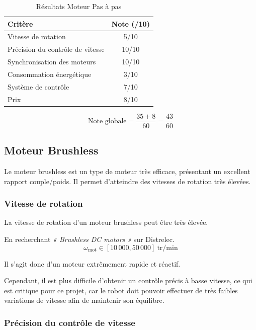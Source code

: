 \begin{table}[H]
    \centering
    \begin{tabular}{|l|c|}
        \hline
        \textbf{Critère} & \textbf{Note (/10)} \\
        \hline
        Vitesse de rotation & 5/10 \\
        \hline
        Précision du contrôle de vitesse & 10/10 \\
        \hline
        Synchronisation des moteurs & 10/10 \\
        \hline
        Consommation énergétique & 3/10 \\
        \hline
        Système de contrôle & 7/10 \\
        \hline
        Prix & 8/10 \\
        \hline
    \end{tabular}
    \caption{Résultats Moteur Pas à pas}
    \label{tab:stepper_resultats}
\end{table}

$$
\text{Note globale}=\frac{35+8}{60}=\frac{43}{60}
$$

\subsection{Moteur Brushless}

Le moteur brushless est un type de moteur très efficace, présentant un excellent rapport couple/poids. Il permet d'atteindre des vitesses de rotation très élevées.

\subsubsection{Vitesse de rotation}

La vitesse de rotation d'un moteur brushless peut être très élevée.

En recherchant \textit{« Brushless DC motors »} sur Distrelec.
$$
\omega_{\text{mot}} \in [10\,000, 50\,000] \ \text{tr/min}
$$

Il s'agit donc d'un moteur extrêmement rapide et réactif.

Cependant, il est plus difficile d'obtenir un contrôle précis à basse vitesse, ce qui est critique pour ce projet, car le robot doit pouvoir effectuer de très faibles variations de vitesse afin de maintenir son équilibre.

\subsubsection{Précision du contrôle de vitesse}

